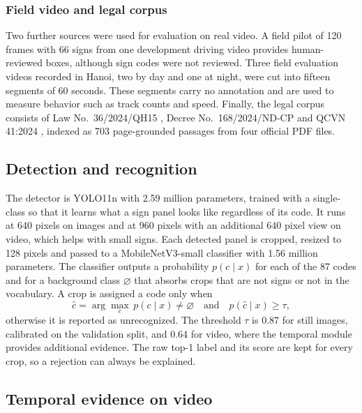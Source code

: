 \documentclass[conference,a4paper]{IEEEtran}
\begin{document}
\subsubsection{Field video and legal corpus}

Two further sources were used for evaluation on real video. A field pilot of 120 frames with 66 signs from one development driving video provides human-reviewed boxes, although sign codes were not reviewed. Three field evaluation videos recorded in Hanoi, two by day and one at night, were cut into fifteen segments of 60 seconds. These segments carry no annotation and are used to measure behavior such as track counts and speed. Finally, the legal corpus consists of Law No.~36/2024/QH15 \cite{law36}, Decree No.~168/2024/ND-CP \cite{decree168} and QCVN 41:2024 \cite{qcvn41}, indexed as 703 page-grounded passages from four official PDF files.



\subsection{Detection and recognition}

The detector is YOLO11n with 2.59 million parameters, trained with a single-class so that it learns what a sign panel looks like regardless of its code. It runs at 640 pixels on images and at 960 pixels with an additional 640 pixel view on video, which helps with small signs. Each detected panel is cropped, resized to 128 pixels and passed to a MobileNetV3-small classifier with 1.56 million parameters. The classifier outputs a probability $p(c \mid x)$ for each of the 87 codes and for a background class $\varnothing$ that absorbs crops that are not signs or not in the vocabulary. A crop is assigned a code only when
\begin{equation}
\hat{c} = \arg\max_{c}\, p(c \mid x) \neq \varnothing \quad \text{and} \quad p(\hat{c} \mid x) \geq \tau ,
\label{eq:accept}
\end{equation}
otherwise it is reported as unrecognized. The threshold $\tau$ is 0.87 for still images, calibrated on the validation split, and 0.64 for video, where the temporal module provides additional evidence. The raw top-1 label and its score are kept for every crop, so a rejection can always be explained.

\subsection{Temporal evidence on video}
\end{document}
